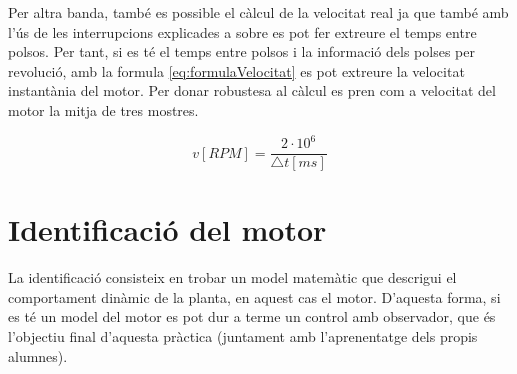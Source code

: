 \documentclass[12pt,a4paper,final,twoside,openright]{report}
\begin{document}
Per altra banda, també es possible el càlcul de la velocitat real ja que també amb l'ús de les interrupcions explicades a sobre es pot fer extreure el temps entre polsos. Per tant, si es té el temps entre polsos i la informació dels polses per revolució, amb la formula \eqref{eq:formulaVelocitat} es pot extreure la velocitat instantània del motor. Per donar robustesa al càlcul es pren com a velocitat del motor la mitja de tres mostres.

\begin{equation}\label{eq:formulaVelocitat}
v [RPM] = \frac{2\cdot 10^6}{\triangle t [ms]}
\end{equation}


\chapter{Identificació del motor}

La identificació consisteix en trobar un model matemàtic que descrigui el comportament dinàmic de la planta, en aquest cas el motor. D'aquesta forma, si es té un model del motor es pot dur a terme un control amb observador, que és l'objectiu final d'aquesta pràctica (juntament amb l'aprenentatge dels propis alumnes). 
\end{document}
